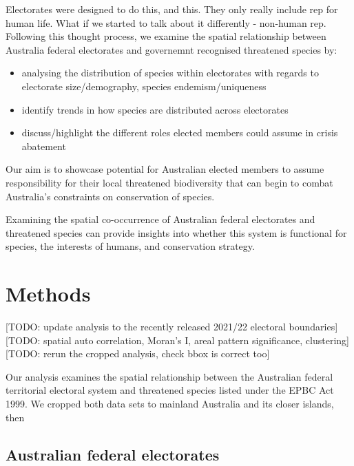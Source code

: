\documentclass[a4paper,11pt]{article}
\begin{document}
Electorates were designed to do this, and this. They only really include rep for human life. What if we started to talk about it differently - non-human rep.
Following this thought process, we examine the spatial relationship between Australia federal electorates and governemnt recognised threatened species by:
\begin{itemize}
    \item analysing the distribution of species within electorates with regards to electorate size/demography, species endemism/uniqueness
    \item identify trends in how species are distributed across electorates
    \item discuss/highlight the different roles elected members could assume in crisis abatement
\end{itemize}


Our aim is to showcase potential for Australian elected members to assume responsibility for their local threatened biodiversity that can begin to combat Australia's constraints on conservation of species. 




Examining the spatial co-occurrence of Australian federal electorates and threatened species can provide insights into whether this system is functional for species, the interests of humans, and conservation strategy.


\section{Methods}
[TODO: update analysis to the recently released 2021/22 electoral boundaries]
[TODO: spatial auto correlation, Moran's I, areal pattern significance, clustering]
[TODO: rerun the cropped analysis, check bbox is correct too]

Our analysis examines the spatial relationship between the Australian federal territorial electoral system and threatened species listed under the EPBC Act 1999. We cropped both data sets to mainland Australia and its closer islands, then 

\subsection{Australian federal electorates}
\end{document}
